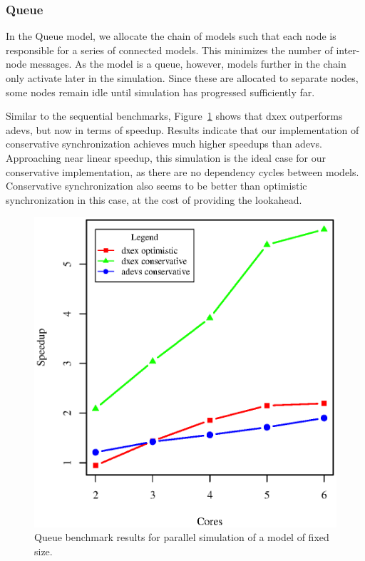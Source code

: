 \subsubsection{Queue}
In the Queue model, we allocate the chain of models such that each node is responsible for a series of connected models.
This minimizes the number of inter-node messages.
As the model is a queue, however, models further in the chain only activate later in the simulation.
Since these are allocated to separate nodes, some nodes remain idle until simulation has progressed sufficiently far.

Similar to the sequential benchmarks, Figure~\ref{fig:queue_benchmark_parallel} shows that dxex outperforms adevs, but now in terms of speedup.
Results indicate that our implementation of conservative synchronization achieves much higher speedups than adevs.
Approaching near linear speedup, this simulation is the ideal case for our conservative implementation, as there are no dependency cycles between models.
Conservative synchronization also seems to be better than optimistic synchronization in this case, at the cost of providing the lookahead.

\begin{figure}
    \center
	\includegraphics[width=\plotfraction\columnwidth]{fig/queue_parallel.eps}
	\caption{Queue benchmark results for parallel simulation of a model of fixed size.}
	\label{fig:queue_benchmark_parallel}
\end{figure}


